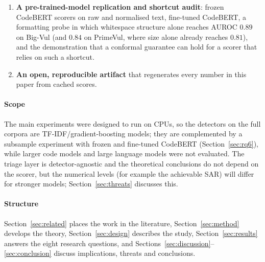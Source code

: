 \begin{enumerate}[itemsep=1pt]
\item \textbf{A pre-trained-model replication and shortcut audit}: frozen CodeBERT scorers on raw and normalised text, fine-tuned CodeBERT, a formatting probe in which whitespace structure alone reaches AUROC $0.89$ on Big-Vul (and $0.84$ on PrimeVul, where size alone already reaches $0.81$), and the demonstration that a conformal guarantee can hold for a scorer that relies on such a shortcut.
\item \textbf{An open, reproducible artifact} that regenerates every number in this paper from cached scores.
\end{enumerate}

\paragraph{Scope} The main experiments were designed to run on CPUs, so the detectors on the full corpora are TF-IDF/gradient-boosting models; they are complemented by a subsample experiment with frozen and fine-tuned CodeBERT (Section~\ref{sec:rq6}), while larger code models and large language models were not evaluated. The triage layer is detector-agnostic and the theoretical conclusions do not depend on the scorer, but the numerical levels (for example the achievable SAR) will differ for stronger models; Section~\ref{sec:threats} discusses this.

\paragraph{Structure} Section~\ref{sec:related} places the work in the literature, Section~\ref{sec:method} develops the theory, Section~\ref{sec:design} describes the study, Section~\ref{sec:results} answers the eight research questions, and Sections~\ref{sec:discussion}--\ref{sec:conclusion} discuss implications, threats and conclusions.
